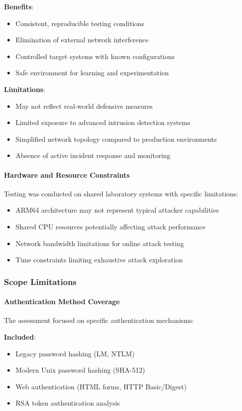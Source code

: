 \textbf{Benefits}:
\begin{itemize}
    \item Consistent, reproducible testing conditions
    \item Elimination of external network interference
    \item Controlled target systems with known configurations
    \item Safe environment for learning and experimentation
\end{itemize}

\textbf{Limitations}:
\begin{itemize}
    \item May not reflect real-world defensive measures
    \item Limited exposure to advanced intrusion detection systems
    \item Simplified network topology compared to production environments
    \item Absence of active incident response and monitoring
\end{itemize}

\paragraph{Hardware and Resource Constraints}
Testing was conducted on shared laboratory systems with specific limitations:
\begin{itemize}
    \item ARM64 architecture may not represent typical attacker capabilities
    \item Shared CPU resources potentially affecting attack performance
    \item Network bandwidth limitations for online attack testing
    \item Time constraints limiting exhaustive attack exploration
\end{itemize}

\subsubsection{Scope Limitations}

\paragraph{Authentication Method Coverage}
The assessment focused on specific authentication mechanisms:

\textbf{Included}:
\begin{itemize}
    \item Legacy password hashing (LM, NTLM)
    \item Modern Unix password hashing (SHA-512)
    \item Web authentication (HTML forms, HTTP Basic/Digest)
    \item RSA token authentication analysis
\end{itemize}

